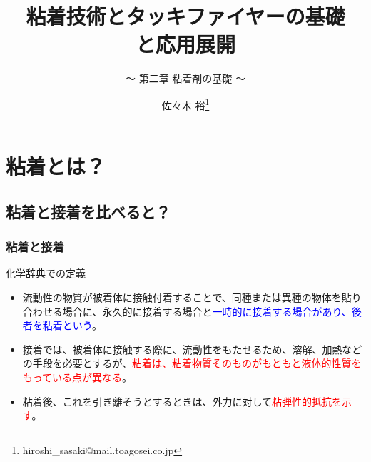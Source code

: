 \documentclass[unicode,12pt]{beamer}%
\title{粘着技術とタッキファイヤーの基礎\\と応用展開}
\subtitle{ ～ 第二章 粘着剤の基礎 ～}
\author[東亞合成 佐々木]{佐々木 裕\thanks{hiroshi\_sasaki@mail.toagosei.co.jp}}
\institute[東亞合成]{東亞合成株式会社}
\date{}
\begin{document}
\maketitle

\begin{frame} 
    \tableofcontents[]
\end{frame} 


\section{粘着とは？}
\subsection{粘着と接着を比べると？}
\begin{frame}
	\frametitle{粘着と接着}
		\begin{block}{化学辞典での定義}
			\begin{itemize}
				\item 流動性の物質が被着体に接触付着することで、同種または異種の物体を貼り合わせる場合に、永久的に接着する場合と\textcolor{blue}{一時的に接着する場合があり、後者を粘着という}。
				\item 接着では、被着体に接触する際に、流動性をもたせるため、溶解、加熱などの手段を必要とするが、\textcolor{red}{粘着は、粘着物質そのものがもともと液体的性質をもっている点が異なる}。
				\item 粘着後、これを引き離そうとするときは、外力に対して\textcolor{red}{粘弾性的抵抗を示す}。
			\end{itemize}
		\end{block}
\end{frame}
\end{document}
